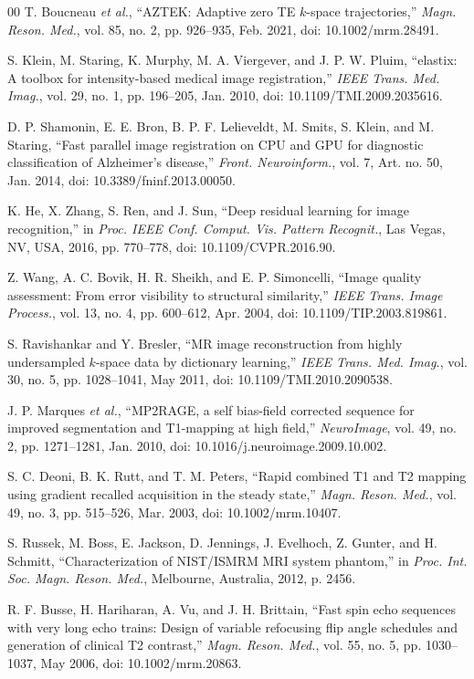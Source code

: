 \documentclass[journal,twoside,web]{ieeecolor}
\begin{document}
\begin{thebibliography}{00}
 T. Boucneau \emph{et al.}, ``AZTEK: Adaptive zero TE $k$-space trajectories,'' \emph{Magn. Reson. Med.}, vol. 85, no. 2, pp. 926--935, Feb. 2021, doi: 10.1002/mrm.28491.

 S. Klein, M. Staring, K. Murphy, M. A. Viergever, and J. P. W. Pluim, ``elastix: A toolbox for intensity-based medical image registration,'' \emph{IEEE Trans. Med. Imag.}, vol. 29, no. 1, pp. 196--205, Jan. 2010, doi: 10.1109/TMI.2009.2035616.

 D. P. Shamonin, E. E. Bron, B. P. F. Lelieveldt, M. Smits, S. Klein, and M. Staring, ``Fast parallel image registration on CPU and GPU for diagnostic classification of Alzheimer's disease,'' \emph{Front. Neuroinform.}, vol. 7, Art. no. 50, Jan. 2014, doi: 10.3389/fninf.2013.00050.

 K. He, X. Zhang, S. Ren, and J. Sun, ``Deep residual learning for image recognition,'' in \emph{Proc. IEEE Conf. Comput. Vis. Pattern Recognit.}, Las Vegas, NV, USA, 2016, pp. 770--778, doi: 10.1109/CVPR.2016.90.

 Z. Wang, A. C. Bovik, H. R. Sheikh, and E. P. Simoncelli, ``Image quality assessment: From error visibility to structural similarity,'' \emph{IEEE Trans. Image Process.}, vol. 13, no. 4, pp. 600--612, Apr. 2004, doi: 10.1109/TIP.2003.819861.

 S. Ravishankar and Y. Bresler, ``MR image reconstruction from highly undersampled $k$-space data by dictionary learning,'' \emph{IEEE Trans. Med. Imag.}, vol. 30, no. 5, pp. 1028--1041, May 2011, doi: 10.1109/TMI.2010.2090538.

 J. P. Marques \emph{et al.}, ``MP2RAGE, a self bias-field corrected sequence for improved segmentation and T1-mapping at high field,'' \emph{NeuroImage}, vol. 49, no. 2, pp. 1271--1281, Jan. 2010, doi: 10.1016/j.neuroimage.2009.10.002.

 S. C. Deoni, B. K. Rutt, and T. M. Peters, ``Rapid combined T1 and T2 mapping using gradient recalled acquisition in the steady state,'' \emph{Magn. Reson. Med.}, vol. 49, no. 3, pp. 515--526, Mar. 2003, doi: 10.1002/mrm.10407.

 S. Russek, M. Boss, E. Jackson, D. Jennings, J. Evelhoch, Z. Gunter, and H. Schmitt, ``Characterization of NIST/ISMRM MRI system phantom,'' in \emph{Proc. Int. Soc. Magn. Reson. Med.}, Melbourne, Australia, 2012, p. 2456.

 R. F. Busse, H. Hariharan, A. Vu, and J. H. Brittain, ``Fast spin echo sequences with very long echo trains: Design of variable refocusing flip angle schedules and generation of clinical T2 contrast,'' \emph{Magn. Reson. Med.}, vol. 55, no. 5, pp. 1030--1037, May 2006, doi: 10.1002/mrm.20863.


\end{thebibliography}
\end{document}
